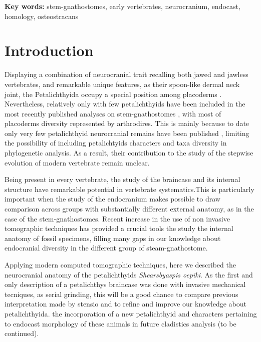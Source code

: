 \documentclass[12pt,letterpaper]{article}
\begin{document}
\noindent \textbf{Key words:} stem-gnathostomes, early vertebrates, neurocranium, endocast, homology, osteostracans

\bigskip

\newpage 
\section{Introduction}
Displaying a combination of neurocranial trait recalling both jawed and jawless vertebrates, and remarkable unique features, as their spoon-like dermal neck joint, the Petalichthyida occupy a special position among placoderms \citep{Janvier1996a,brazeau2009braincase,brazeau2014characters,Janvier2015,brazeau2015origin}. Nevertheless, relatively only with few petalichthyids have been included in the most recently published analyses on stem-gnathostomes \citep{brazeau2009braincase,davis2012,zhu2013silurian,long2015copulation,giles2015osteichthyan}, with most of placoderms diversity represented by arthrodires. This is mainly because to date only very few petalichthyid neurocranial remains have been published \citep{Stensi1925,Stensi1969,Young1978,pan2015new}, limiting the possibility of including petalichtyids characters and taxa diversity in phylogenetic analysis. As a result, their contribution to the study of the stepwise evolution of modern vertebrate remain unclear.

Being present in every vertebrate, the study of the braincase and its internal structure have remarkable potential in vertebrate systematics.This is particularly important when the study of the endocranium makes possible to draw comparison across groups with substantially different external anatomy, as in the case of the stem-gnathostomes. Recent increase in the use of non invasive tomographic techniques has provided a crucial tools the study the internal anatomy of fossil specimens, filling many gaps in our knowledge about endocranial diversity in the different group of steam-gnathostome. 

Applying modern computed tomographic techniques, here we described the neurocranial anatomy of the petalichthyids \textit{Shearsbyaspis oepiki}. As the first and only description of a petalichthys braincase was done with invasive mechanical tecniques, as serial grinding, this will be a good chance to compare previous interpretation made by stensio and to refine and improve our knowledge about petalichthyida. the incorporation of a new petalichthyid and characters pertaining to endocast morphology of these animals in future cladistics analysis (to be continued).
\end{document}
